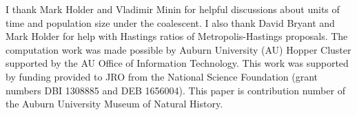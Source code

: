 I thank Mark Holder and Vladimir Minin for helpful discussions about units of
time and population size under the coalescent.
I also thank David Bryant and Mark Holder for help with Hastings ratios of
Metropolis-Hastings proposals.
The computation work was made possible by Auburn University (AU) Hopper Cluster
supported by the AU Office of Information Technology.
This work was supported by funding provided to JRO from the National Science
Foundation (grant numbers DBI 1308885 and DEB 1656004).
This paper is contribution number  of the Auburn University
Museum of Natural History.

